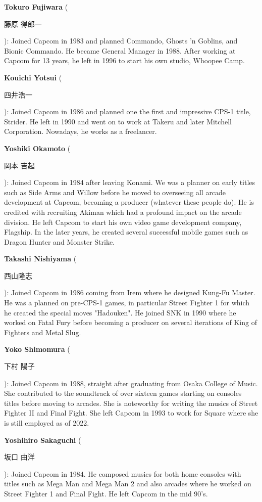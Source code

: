 \textbf{Tokuro Fujiwara} (\begin{CJK}{UTF8}{min}藤原 得郎一\end{CJK}): Joined Capcom in 1983 and planned Commando, Ghosts 'n Goblins, and Bionic Commando. He became General Manager in 1988. After working at Capcom for 13 years, he left in 1996 to start his own studio, Whoopee Camp.

\textbf{Kouichi Yotsui} (\begin{CJK}{UTF8}{min}四井浩一\end{CJK}): Joined Capcom in 1986 and planned one the first and impressive CPS-1 title, Strider. He left in 1990 and went on to work at Takeru and later Mitchell Corporation. Nowadays, he works as a freelancer.

\textbf{Yoshiki Okamoto} (\begin{CJK}{UTF8}{min}岡本 吉起\end{CJK}): Joined Capcom in 1984 after leaving Konami. We was a planner on early titles such as Side Arms and Willow before he moved to overseeing all arcade development at Capcom, becoming a producer (whatever these people do). He is credited with recruiting Akiman which had a profound impact on the arcade division. He left Capcom to start his own video game development company, Flagship. In the later years, he created several successful mobile games such as Dragon Hunter and Monster Strike.   

\textbf{Takashi Nishiyama} (\begin{CJK}{UTF8}{min}西山隆志\end{CJK}): Joined Capcom in 1986 coming from Irem where he designed Kung-Fu Master. He was a planned on pre-CPS-1 games, in particular Street Fighter 1 for which he created the special moves "Hadouken". He joined SNK in 1990 where he worked on Fatal Fury before becoming a producer on several iterations of King of Fighters and Metal Slug.


\textbf{Yoko Shimomura} (\begin{CJK}{UTF8}{min}下村 陽子\end{CJK}): Joined Capcom in 1988, straight after graduating from Osaka College of Music. She contributed to the soundtrack of over sixteen games starting on consoles titles before moving to arcades. She is noteworthy for writing the musics of Street Fighter II and Final Fight. She left Capcom in 1993 to work for Square where she is still employed as of 2022.

\textbf{Yoshihiro Sakaguchi} (\begin{CJK}{UTF8}{min}坂口 由洋\end{CJK}): Joined Capcom in 1984. He composed musics for both home consoles with titles such as Mega Man and Mega Man 2 and also arcades where he worked on Street Fighter 1 and Final Fight. He left Capcom in the mid 90's.